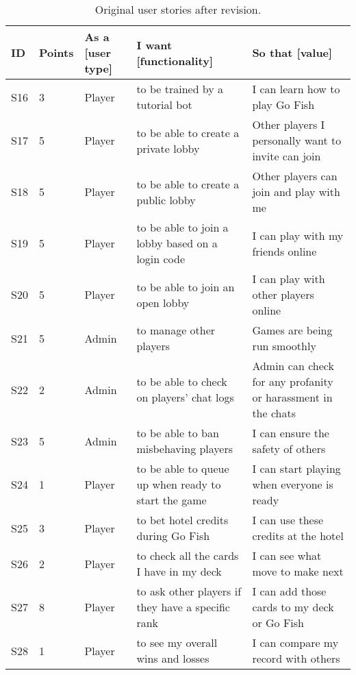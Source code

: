 \pagebreak
\begin{table}[h!]
\centering
\small
\begin{tabularx}{\textwidth}{|l|l|p{1cm}|X|X|}
\hline
\textbf{ID} & \textbf{Points} & \textbf{As a [user type]} & \textbf{I want [functionality]} & \textbf{So that [value]} \\ \hline
\rowcolor{cyan!25}
S16 & 3 & Player & to be trained by a tutorial bot & I can learn how to play Go Fish \\ \hline
\rowcolor{cyan!25}
S17 & 5 & Player & to be able to create a private lobby & Other players I personally want to invite can join \\ \hline
\rowcolor{cyan!25}
S18 & 5 & Player & to be able to create a public lobby & Other players can join and play with me \\ \hline
\rowcolor{cyan!25}
S19 & 5 & Player & to be able to join a lobby based on a login code & I can play with my friends online \\ \hline
\rowcolor{cyan!25}
S20 & 5 & Player & to be able to join an open lobby & I can play with other players online \\ \hline
\rowcolor{cyan!25}
S21 & 5 & Admin & to manage other players & Games are being run smoothly \\ \hline
S22 & 2 & Admin & to be able to check on players' chat logs & Admin can check for any profanity or harassment in the chats \\ \hline
S23 & 5 & Admin & to be able to ban misbehaving players & I can ensure the safety of others \\ \hline
\rowcolor{cyan!25}
S24 & 1 & Player & to be able to queue up when ready to start the game & I can start playing when everyone is ready \\ \hline
S25 & 3 & Player & to bet hotel credits during Go Fish & I can use these credits at the hotel \\ \hline
S26 & 2 & Player & to check all the cards I have in my deck & I can see what move to make next \\ \hline
S27 & 8 & Player & to ask other players if they have a specific rank & I can add those cards to my deck or Go Fish \\ \hline
S28 & 1 & Player & to see my overall wins and losses & I can compare my record with others \\ \hline
\end{tabularx}
\caption{Original user stories after revision.}
\end{table}

